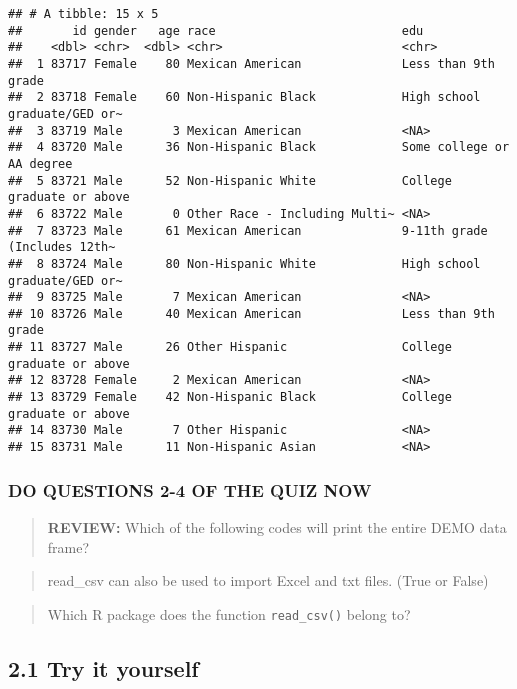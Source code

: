 \documentclass[
]{book}
\begin{document}
\begin{verbatim}
## # A tibble: 15 x 5
##       id gender   age race                          edu                         
##    <dbl> <chr>  <dbl> <chr>                         <chr>                       
##  1 83717 Female    80 Mexican American              Less than 9th grade         
##  2 83718 Female    60 Non-Hispanic Black            High school graduate/GED or~
##  3 83719 Male       3 Mexican American              <NA>                        
##  4 83720 Male      36 Non-Hispanic Black            Some college or AA degree   
##  5 83721 Male      52 Non-Hispanic White            College graduate or above   
##  6 83722 Male       0 Other Race - Including Multi~ <NA>                        
##  7 83723 Male      61 Mexican American              9-11th grade (Includes 12th~
##  8 83724 Male      80 Non-Hispanic White            High school graduate/GED or~
##  9 83725 Male       7 Mexican American              <NA>                        
## 10 83726 Male      40 Mexican American              Less than 9th grade         
## 11 83727 Male      26 Other Hispanic                College graduate or above   
## 12 83728 Female     2 Mexican American              <NA>                        
## 13 83729 Female    42 Non-Hispanic Black            College graduate or above   
## 14 83730 Male       7 Other Hispanic                <NA>                        
## 15 83731 Male      11 Non-Hispanic Asian            <NA>
\end{verbatim}

\hypertarget{do-questions-2-4-of-the-quiz-now}{%
\subsubsection{DO QUESTIONS 2-4 OF THE QUIZ NOW}\label{do-questions-2-4-of-the-quiz-now}}

\begin{quote}
\textbf{REVIEW:} Which of the following codes will print the entire DEMO data frame?
\end{quote}

\begin{quote}
read\_csv can also be used to import Excel and txt files. (True or False)
\end{quote}

\begin{quote}
Which R package does the function \texttt{read\_csv()} belong to?
\end{quote}

\hypertarget{try-it-yourself-9}{%
\subsection{2.1 Try it yourself}\label{try-it-yourself-9}}
\end{document}
